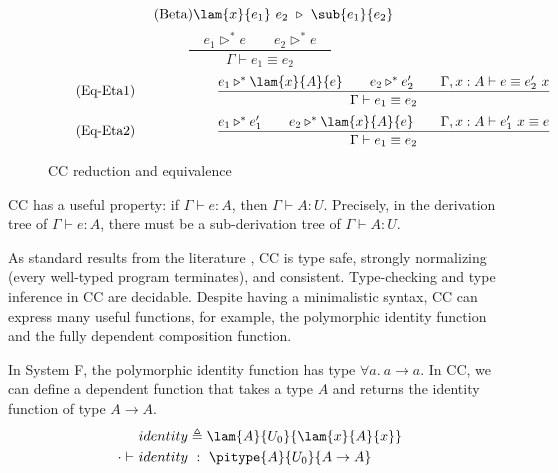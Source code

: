 \begin{figure}
	\begin{equation*}
		\tag{Beta}
		\lam{x}{e_1} \ e_2 \ \triangleright \ \sub{e_1}{e_2}
	\end{equation*}
	\begin{equation}
		\tag{Eq-eq}
		\frac
			{\quad e_1 \triangleright^* e \qquad e_ 2\triangleright^* e \quad}
			{\Gamma \vdash e_1 \equiv e_2}
	\end{equation}
	\begin{equation}
		\tag{Eq-Eta1}
		\qquad\qquad\qquad
		\frac
			{e_1 \triangleright^* \lam{x}{A}{e} \qquad
			 e_2 \triangleright^* e_2' \qquad
			 \Gamma, x : A \vdash e \equiv e_2'\ x}
			{\Gamma \vdash e_1 \equiv e_2}
	\end{equation}
	\begin{equation}
		\tag{Eq-Eta2}
		\qquad\qquad\qquad
		\frac
			{ e_1 \triangleright^* e_1' \qquad
			 e_2 \triangleright^* \lam{x}{A}{e} \qquad
			 \Gamma, x : A \vdash e_1'\ x \equiv e }
			{\Gamma \vdash e_1 \equiv e_2}
	\end{equation}
	\caption{CC reduction and equivalence}
    \label{fig:cc equivalence}
\end{figure}



CC has a useful property: if $\Gamma \vdash e : A$, then $\Gamma \vdash A : U$. Precisely, in the derivation tree of $\Gamma \vdash e : A$, there must be a sub-derivation tree of $\Gamma \vdash A : U$.

As standard results from the literature \cite{coquand1986calculus,luo1990extended}, CC is type safe, strongly normalizing (every well-typed program terminates), and consistent. Type-checking and type inference in CC are decidable. Despite having a minimalistic syntax, CC can express many useful functions, for example, the polymorphic identity function and the fully dependent composition function.

\begin{exmp}
In System F, the polymorphic identity function has type $\forall a.\ a \rightarrow a$. In CC, we can define a  dependent function that takes a type $A$ and returns the identity function of type $A \rightarrow A$.
	\begin{align*}
		&identity \triangleq \lam{A}{U_0}{\lam{x}{A}{x}} \\
		\cdot \vdash\ &identity\ :\ \pitype{A}{U_0}{A \rightarrow A}
	\end{align*}
\end{exmp}

